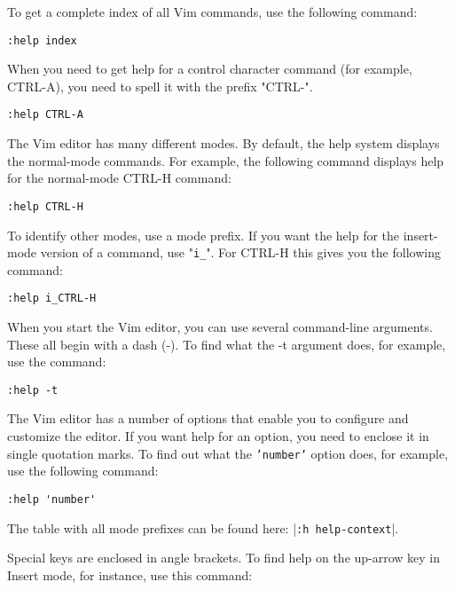 To get a complete index of all Vim commands, use the following command:

 \begin{Verbatim}[samepage=true]
 :help index
 \end{Verbatim}

When you need to get help for a control character command (for example, CTRL-A), you need to spell it with the prefix "CTRL-".

 \begin{Verbatim}[samepage=true]
 :help CTRL-A
 \end{Verbatim}

The Vim editor has many different modes.
By default, the help system displays the normal-mode commands.
For example, the following command displays help for the normal-mode CTRL-H command: 

 \begin{Verbatim}[samepage=true]
 :help CTRL-H
 \end{Verbatim}

To identify other modes, use a mode prefix.
If you want the help for the insert-mode version of a command, use "\texttt{i\_}".
For CTRL-H this gives you the following command: 

 \begin{Verbatim}[samepage=true]
 :help i_CTRL-H
 \end{Verbatim}

When you start the Vim editor, you can use several command-line arguments.
These all begin with a dash (-).
To find what the -t argument does, for example, use the command: 

 \begin{Verbatim}[samepage=true]
 :help -t
 \end{Verbatim}

The Vim editor has a number of options that enable you to configure and customize the editor.
If you want help for an option, you need to enclose it in single quotation marks.
To find out what the \texttt{'number'} option does, for example, use the following command: 

 \begin{Verbatim}[samepage=true]
 :help 'number'
 \end{Verbatim}

The table with all mode prefixes can be found here: |\texttt{:h help-context}|.

Special keys are enclosed in angle brackets.
To find help on the up-arrow key in Insert mode, for instance, use this command: 

